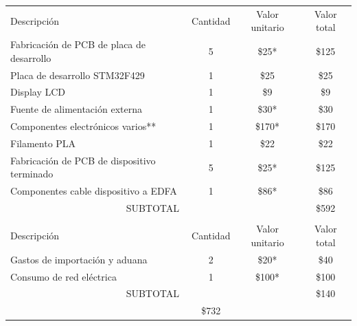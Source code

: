 \documentclass[
11pt, %
]{charter}
\begin{document}
\begin{table}[H]
\centering
\begin{tabularx}{\linewidth}{@{}|X|c|r|r|@{}}
\hline
\rowcolor[HTML]{C0C0C0} 
\multicolumn{4}{|c|}{\cellcolor[HTML]{C0C0C0}COSTOS DIRECTOS} \\ \hline
\rowcolor[HTML]{C0C0C0} 
Descripción &
  \multicolumn{1}{c|}{\cellcolor[HTML]{C0C0C0}Cantidad} &
  \multicolumn{1}{c|}{\cellcolor[HTML]{C0C0C0}Valor unitario} &
  \multicolumn{1}{c|}{\cellcolor[HTML]{C0C0C0}Valor total} \\ \hline
Fabricación de PCB de placa de desarrollo &
  \multicolumn{1}{c|}{5} &
  \multicolumn{1}{c|}{\$25*} &
  \multicolumn{1}{c|}{\$125} \\ \hline
Placa de desarrollo STM32F429 &
  \multicolumn{1}{c|}{1} &
  \multicolumn{1}{c|}{\$25} &
  \multicolumn{1}{c|}{\$25} \\ \hline
Display LCD &
  \multicolumn{1}{c|}{1} &
  \multicolumn{1}{c|}{\$9} &
  \multicolumn{1}{c|}{\$9} \\ \hline
Fuente de alimentación externa &
  \multicolumn{1}{c|}{1} &
  \multicolumn{1}{c|}{\$30*} &
  \multicolumn{1}{c|}{\$30} \\ \hline
Componentes electrónicos varios** &
  \multicolumn{1}{c|}{1} &
  \multicolumn{1}{c|}{\$170*} &
  \multicolumn{1}{c|}{\$170} \\ \hline
Filamento PLA &
  \multicolumn{1}{c|}{1} &
  \multicolumn{1}{c|}{\$22} &
  \multicolumn{1}{c|}{\$22} \\ \hline
Fabricación de PCB de dispositivo terminado &
  \multicolumn{1}{c|}{5} &
  \multicolumn{1}{c|}{\$25*} &
  \multicolumn{1}{c|}{\$125} \\ \hline
Componentes cable dispositivo a EDFA &
  \multicolumn{1}{c|}{1} &
  \multicolumn{1}{c|}{\$86*} &
  \multicolumn{1}{c|}{\$86} \\ \hline
\multicolumn{3}{|c|}{SUBTOTAL} &
  \multicolumn{1}{c|}{\$592} \\ \hline
\rowcolor[HTML]{C0C0C0} 
\multicolumn{4}{|c|}{\cellcolor[HTML]{C0C0C0}COSTOS INDIRECTOS} \\ \hline
\rowcolor[HTML]{C0C0C0} 
Descripción &
  \multicolumn{1}{c|}{\cellcolor[HTML]{C0C0C0}Cantidad} &
  \multicolumn{1}{c|}{\cellcolor[HTML]{C0C0C0}Valor unitario} &
  \multicolumn{1}{c|}{\cellcolor[HTML]{C0C0C0}Valor total} \\ \hline
Gastos de importación y aduana &
  \multicolumn{1}{c|}{2} &
  \multicolumn{1}{c|}{\$20*} &
  \multicolumn{1}{c|}{\$40} \\ \hline
Consumo de red eléctrica &
  \multicolumn{1}{c|}{1} &
  \multicolumn{1}{c|}{\$100*} &
  \multicolumn{1}{c|}{\$100} \\ \hline
\multicolumn{3}{|c|}{SUBTOTAL} &
  \multicolumn{1}{c|}{\$140} \\ \hline
\rowcolor[HTML]{C0C0C0}
\multicolumn{3}{|c|}{TOTAL} &
 \multicolumn{1}{|c|}{\$732}
   \\ \hline
\end{tabularx}
\end{table}
\end{document}

